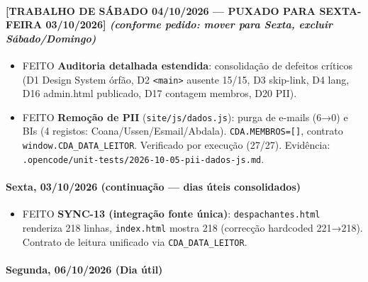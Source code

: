 \paragraph{\texorpdfstring{\textbf{{[}TRABALHO DE SÁBADO 04/10/2026 ---
PUXADO PARA SEXTA-FEIRA 03/10/2026{]}} \emph{(conforme pedido: mover
para Sexta, excluir
Sábado/Domingo)}}{{[}TRABALHO DE SÁBADO 04/10/2026 --- PUXADO PARA SEXTA-FEIRA 03/10/2026{]} (conforme pedido: mover para Sexta, excluir Sábado/Domingo)}}\label{trabalho-de-suxe1bado-04102026-puxado-para-sexta-feira-03102026-conforme-pedido-mover-para-sexta-excluir-suxe1badodomingo}

\begin{itemize}
\tightlist
\item
  {FEITO} \textbf{Auditoria detalhada estendida}: consolidação de
  defeitos críticos (D1 Design System órfão, D2
  \texttt{\textless{}main\textgreater{}} ausente 15/15, D3 skip-link, D4
  lang, D16 admin.html publicado, D17 contagem membros, D20 PII).
\item
  {FEITO} \textbf{Remoção de PII} (\texttt{site/js/dados.js}): purga de
  e-mails (6→0) e BIs (4 registos: Coana/Ussen/Esmail/Abdala).
  \texttt{CDA.MEMBROS={[}{]}}, contrato
  \texttt{window.CDA\_DATA\_LEITOR}. Verificado por execução (27/27).
  Evidência: \texttt{.opencode/unit-tests/2026-10-05-pii-dados-js.md}.
\end{itemize}

\paragraph{Sexta, 03/10/2026 (continuação --- dias úteis
consolidados)}\label{sexta-03102026-continuauxe7uxe3o-dias-uxfateis-consolidados}

\begin{itemize}
\tightlist
\item
  {FEITO} \textbf{SYNC-13 (integração fonte única)}:
  \texttt{despachantes.html} renderiza 218 linhas, \texttt{index.html}
  mostra 218 (correcção hardcoded 221→218). Contrato de leitura
  unificado via \texttt{CDA\_DATA\_LEITOR}.
\end{itemize}

\paragraph{Segunda, 06/10/2026 (Dia
útil)}\label{segunda-06102026-dia-uxfatil}

